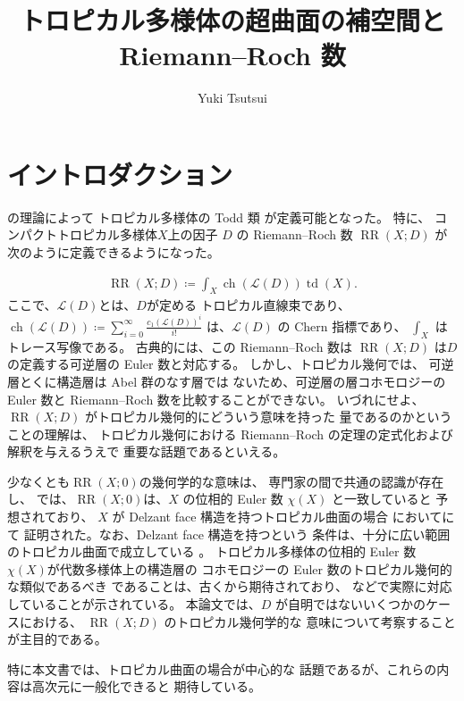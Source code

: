 \documentclass[a4paper,dvipdfmx,reqno,12pt]{amsart}
\title{トロピカル多様体の超曲面の補空間と Riemann--Roch 数}
\author[Y. Tsutsui]{Yuki Tsutsui}
\theoremstyle{definition}
\newcommand{\deq}{\coloneqq}
\newcommand{\opn}[1]{\operatorname{#1}}
\numberwithin{equation}{section}
\begin{document}
\maketitle

\section{イントロダクション}

\cite{demedrano2023chern}の理論によって
トロピカル多様体の Todd 類 が定義可能となった。
特に、
コンパクトトロピカル多様体$X$上の因子
$D$ の
Riemann--Roch 数 $\opn{RR}(X;D)$ が
次のように定義できるようになった。

\begin{align}
     \opn{RR}(X;D)\deq \int_{X}\opn{ch}(\mathcal{L}(D))\opn{td}(X).
\end{align}
ここで、$\mathcal{L}(D)$とは、$D$が定める
トロピカル直線束であり、
$\opn{ch}(\mathcal{L}(D))\deq 
\sum_{i=0}^{\infty}\frac{c_1(\mathcal{L}(D))^{i}}{i!}$
は、$\mathcal{L}(D)$ の Chern 指標であり、
$\int_X$ はトレース写像である。
古典的には、この Riemann--Roch 数は $\opn{RR}(X;D)$
は$D$の定義する可逆層の Euler 数と対応する。
しかし、トロピカル幾何では、
可逆層とくに構造層は Abel 群のなす層では
ないため、可逆層の層コホモロジーの Euler 数と
Riemann--Roch 数を比較することができない。
いづれにせよ、
$\opn{RR}(X;D)$ がトロピカル幾何的にどういう意味を持った
量であるのかということの理解は、
トロピカル幾何における
Riemann--Roch の定理の定式化および解釈を与えるうえで
重要な話題であるといえる。

少なくとも$\opn{RR}(X;0)$の幾何学的な意味は、
専門家の間で共通の認識が存在し、
\cite[Conjecture 6.13]{demedrano2023chern}
では、$\opn{RR}(X;0)$は、$X$
の位相的 Euler 数 $\chi(X)$ と一致していると
予想されており、
$X$ が Delzant face 構造を持つトロピカル曲面の場合
において\cite[Theorem 6.3]{demedrano2023chern}にて
証明された。なお、Delzant face 構造を持つという
条件は、十分に広い範囲のトロピカル曲面で成立している
\cite[Corollary 6.11]{demedrano2023chern}。
トロピカル多様体の位相的 Euler 数
$\chi(X)$が代数多様体上の構造層の
コホモロジーの Euler 数のトロピカル幾何的な類似であるべき
であることは、古くから期待されており、
\cite[Corollary 2]{MR3961331}
などで実際に対応していることが示されている。
本論文では、$D$ が自明ではないいくつかのケースにおける、
$\opn{RR}(X;D)$ のトロピカル幾何学的な
意味について考察することが主目的である。




特に本文書では、トロピカル曲面の場合が中心的な
話題であるが、これらの内容は高次元に一般化できると
期待している。
\end{document}
